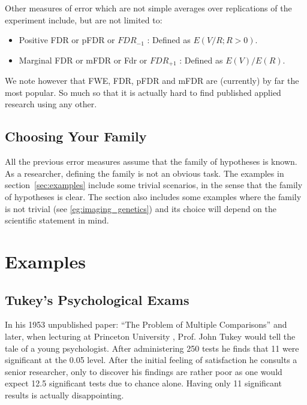 \documentclass[draft,12pt]{article}
\begin{document}
Other measures of error which are not simple averages over replications of the experiment include, but are not limited to:
\begin{itemize}
\item Positive FDR or pFDR \citep{storey_direct_2002} or $FDR_{-1}$ \citep{benjamini_discovering_2010} : Defined as $E(V/R;R>0)$.
\item Marginal FDR or mFDR \citep{sun_oracle_2007} or Fdr \citep{efron_microarrays_2008} or $FDR_{+1}$ \citep{benjamini_discovering_2010}: Defined as $E(V)/E(R)$.
\end{itemize}

We note however that FWE, FDR, pFDR and mFDR are (currently) by far the most popular. So much so that it is actually hard to find published applied research using any other. 



\subsection{Choosing Your Family}
All the previous error measures assume that the family of hypotheses is known. As a researcher, defining the family is not an obvious task. The examples in section~\ref{sec:examples} include some trivial scenarios, in the sense that the family of hypotheses is clear. The section also includes some examples where the family is not trivial (see \ref{eg:imaging_genetics}) and its choice will depend on the scientific statement in mind.




\section{\label{sec:examples}Examples}



\subsection{Tukey's Psychological Exams}
In his 1953 unpublished paper: ``The Problem of Multiple Comparisons'' \citep{benjamini_john_2002} and later, when lecturing at Princeton University \citep{donoho_higher_2004}, Prof. John Tukey would tell the tale of a young psychologist. After administering 250 tests he finds that 11 were significant at the 0.05 level. After the initial feeling of satisfaction he consults a senior researcher, only to discover his findings are rather poor as one  would expect 12.5 significant tests due to chance alone. Having only 11 significant results is actually disappointing.
\end{document}
